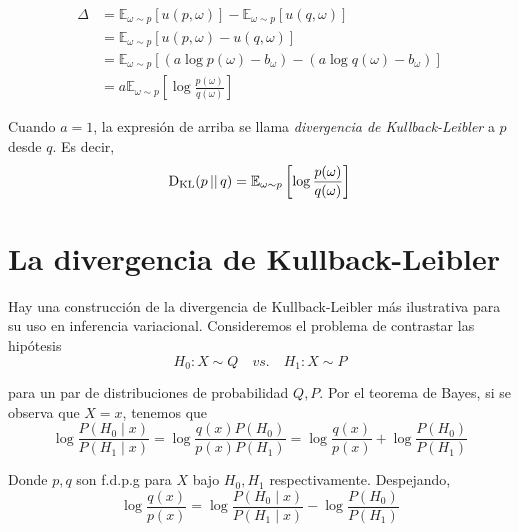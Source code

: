 \documentclass[main.tex]{subfiles}
\begin{document}
\begin{align*}
	\Delta &= \mathbb{E}_{\omega \sim p}\left[u(p, \omega)\right] - \mathbb{E}_{\omega\sim p}\left[u(q, \omega)\right]  \\
	&= \mathbb{E}_{\omega \sim p}\left[u(p, \omega) - u(q, \omega)\right] \\
	&= \mathbb{E}_{\omega \sim p}\left[(a\log p(\omega) - b_\omega) - (a\log q(\omega) - b_\omega) \right] \\
	&= a\mathbb{E}_{\omega \sim p}\left[\log\frac{p(\omega)}{q(\omega)}\right]
\end{align*}

\begin{definition}\label{def:kl-fea}
	Cuando $a=1$, la expresión de arriba se llama \textit{divergencia de Kullback-Leibler} a $p$ desde $q$. Es decir, 
	\begin{equation}\label{eqn:kl-fea}
	\operatorname*{D_{KL}}(p \operatorname*{\mid\mid} q) = \mathbb{E}_{\omega \sim p}\left[\log\frac{p(\omega)}{q(\omega)}\right]	
	\end{equation}
\end{definition}

\section{La divergencia de Kullback-Leibler}
Hay una construcción de la divergencia de Kullback-Leibler  más ilustrativa para su uso en inferencia variacional. Consideremos el problema de contrastar las hipótesis 
\begin{equation*}
H_0: X \sim Q \quad vs.\quad H_1: X \sim P
\end{equation*}

para un par de distribuciones de probabilidad $Q, P$. Por el teorema de Bayes, si se observa que $X=x$, tenemos que
\begin{equation*}
\log\frac{P(H_0\mid x)}{P(H_1\mid x)} = 
	\log\frac{q(x)P(H_0)}{p(x)P(H_1)} =
	\log\frac{q(x)}{p(x)}+\log\frac{P(H_0)}{P(H_1)}
\end{equation*}

Donde $p, q$ son f.d.p.g para $X$ bajo $H_0, H_1$ respectivamente. Despejando,
\begin{equation*}
	\log\frac{q(x)}{p(x)} = \log\frac{P(H_0\mid x)}{P(H_1\mid x)} - \log\frac{P(H_0)}{P(H_1)}
\end{equation*}
\end{document}
